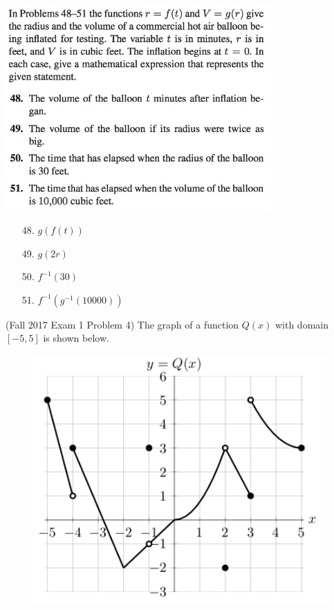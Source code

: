 \documentclass[11pt]{exam}
\begin{document}
\begin{questions}
\begin{parts}
	\includegraphics[width=4in]{Figures/no48.jpg}
        \begin{solution}
          \begin{enumerate}
          \item[48.] \(g(f(t))\)
          \item[49.] \(g(2r)\)
          \item[50.] \(f^{-1}(30)\)
          \item[51.] \(f^{-1}(g^{-1}(10000))\)
          \end{enumerate}
        \end{solution}
	\end{parts}
  \question (Fall 2017 Exam 1 Problem 4) The graph of a function
  $Q(x)$ with domain $[-5, 5]$ is shown below.
  \begin{figure}[h]
    \includegraphics[scale=0.35]{Figures/Graphg}
  \end{figure}
  \begin{parts}

\end{parts}
\end{questions}
\end{document}
